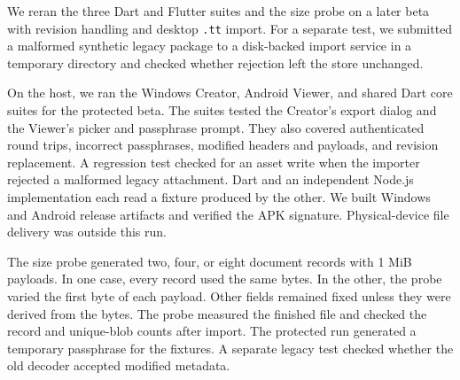 We reran the three Dart and Flutter suites and the size probe on a later beta with revision handling and desktop \texttt{.tt} import. For a separate test, we submitted a malformed synthetic legacy package to a disk-backed import service in a temporary directory and checked whether rejection left the store unchanged.

On the host, we ran the Windows Creator, Android Viewer, and shared Dart core suites for the protected beta. The suites tested the Creator's export dialog and the Viewer's picker and passphrase prompt. They also covered authenticated round trips, incorrect passphrases, modified headers and payloads, and revision replacement. A regression test checked for an asset write when the importer rejected a malformed legacy attachment. Dart and an independent Node.js implementation each read a fixture produced by the other. We built Windows and Android release artifacts and verified the APK signature. Physical-device file delivery was outside this run.

The size probe generated two, four, or eight document records with 1 MiB payloads. In one case, every record used the same bytes. In the other, the probe varied the first byte of each payload. Other fields remained fixed unless they were derived from the bytes. The probe measured the finished file and checked the record and unique-blob counts after import. The protected run generated a temporary passphrase for the fixtures. A separate legacy test checked whether the old decoder accepted modified metadata.
